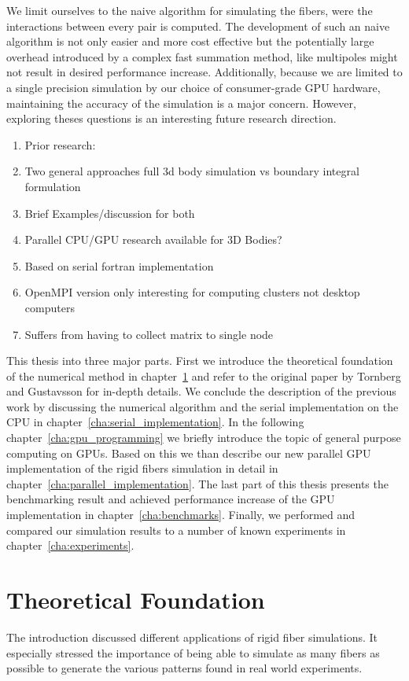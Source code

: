 \documentclass[a4paper,11pt]{kth-mag}
\begin{document}
We limit ourselves to the naive algorithm for simulating the fibers, were the interactions between every pair is computed. The development of such an naive algorithm is not only easier and more cost effective but the potentially large overhead introduced by a complex fast summation method, like multipoles might not result in desired performance increase. Additionally, because we are limited to a single precision simulation by our choice of consumer-grade GPU hardware, maintaining the accuracy of the simulation is a major concern. However, exploring theses questions is an interesting future research direction.

\begin{enumerate}
\item Prior research:
\item Two general approaches full 3d body simulation vs boundary integral formulation
\item Brief Examples/discussion for both
\item Parallel CPU/GPU research available for 3D Bodies?
\item Based on serial fortran implementation
\item OpenMPI version only interesting for computing clusters not desktop computers
\item Suffers from having to collect matrix to single node
\end{enumerate}


This thesis into three major parts. First we introduce the theoretical foundation of the numerical method in chapter~\ref{cha:theoretical_foundation} and refer to the original paper by Tornberg and Gustavsson for in-depth details. We conclude the description of the previous work by discussing the numerical algorithm and the serial implementation on the CPU in chapter~\ref{cha:serial_implementation}. In the following chapter~\ref{cha:gpu_programming} we briefly introduce the topic of general purpose computing on GPUs. Based on this we than describe our new parallel GPU implementation of the rigid fibers simulation in detail in chapter~\ref{cha:parallel_implementation}. The last part of this thesis presents the benchmarking result and achieved performance increase of the GPU implementation in chapter~\ref{cha:benchmarks}. Finally, we performed and compared our simulation results to a number of known experiments in chapter~\ref{cha:experiments}.

\chapter{Theoretical Foundation}
\label{cha:theoretical_foundation}
The introduction discussed different applications of rigid fiber simulations. It especially stressed the importance of being able to simulate as many fibers as possible to generate the various patterns found in real world experiments.
\end{document}
